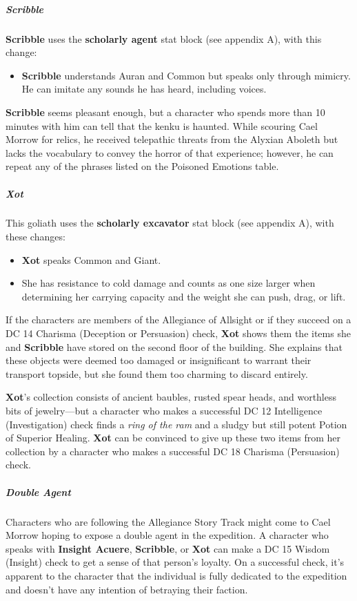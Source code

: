 \documentclass[10pt,a4paper,twoside,bg=print,twocolumn,openany,nodeprecatedcode]{dndbook}
\begin{document}
\subparagraph{Scribble}
\textbf{Scribble} uses the \textbf{scholarly agent} stat block (see appendix A), with this change:


\begin{itemize}
\item \textbf{Scribble} understands Auran and Common but speaks only through mimicry. He can imitate any sounds he has heard, including voices.
\end{itemize}

\textbf{Scribble} seems pleasant enough, but a character who spends more than 10 minutes with him can tell that the kenku is haunted. While scouring Cael Morrow for relics, he received telepathic threats from the Alyxian Aboleth but lacks the vocabulary to convey the horror of that experience; however, he can repeat any of the phrases listed on the Poisoned Emotions table.

\subparagraph{Xot}
This goliath uses the \textbf{scholarly excavator} stat block (see appendix A), with these changes:


\begin{itemize}
\item \textbf{Xot} speaks Common and Giant.
\item She has resistance to cold damage and counts as one size larger when determining her carrying capacity and the weight she can push, drag, or lift.
\end{itemize}

If the characters are members of the Allegiance of Allsight or if they succeed on a DC 14 Charisma (Deception or Persuasion) check, \textbf{Xot} shows them the items she and \textbf{Scribble} have stored on the second floor of the building. She explains that these objects were deemed too damaged or insignificant to warrant their transport topside, but she found them too charming to discard entirely.

\textbf{Xot}'s collection consists of ancient baubles, rusted spear heads, and worthless bits of jewelry—but a character who makes a successful DC 12 Intelligence (Investigation) check finds a \textit{ring of the ram} and a sludgy but still potent Potion of Superior Healing. \textbf{Xot} can be convinced to give up these two items from her collection by a character who makes a successful DC 18 Charisma (Persuasion) check.

\subparagraph{Double Agent}
Characters who are following the Allegiance Story Track might come to Cael Morrow hoping to expose a double agent in the expedition. A character who speaks with \textbf{Insight Acuere}, \textbf{Scribble}, or \textbf{Xot} can make a DC 15 Wisdom (Insight) check to get a sense of that person's loyalty. On a successful check, it's apparent to the character that the individual is fully dedicated to the expedition and doesn't have any intention of betraying their faction.
\end{document}
